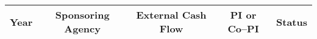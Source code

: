 \begin{center}{\small
		\begin{tabular}{||c|c|c|c|c||}
			\hline \hline
			Year & Sponsoring Agency & External Cash Flow & PI or Co--PI & Status\\
			\hline \hline

	\end{tabular}}
\end{center}